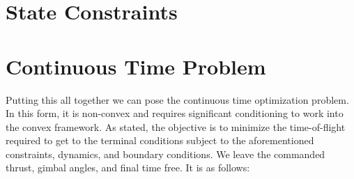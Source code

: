 \section{State Constraints}



\section{Continuous Time Problem}
Putting this all together we can pose the continuous time optimization problem. In this form, it is non-convex and requires significant conditioning to work into the convex framework. As stated, the objective is to minimize the time-of-flight required to get to the terminal conditions subject to the aforementioned constraints, dynamics, and boundary conditions. We leave the commanded thrust, gimbal angles, and final time free. It is as follows:
\clearpage

